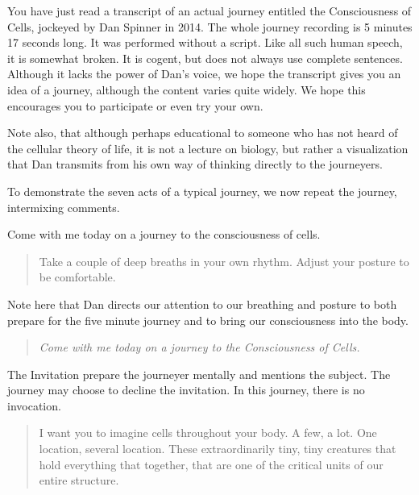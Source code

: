 \documentclass[12pt]{book}
\begin{document}
\hrulefill

You have just read a transcript of an actual journey entitled the Consciousness of Cells, jockeyed by Dan Spinner in 2014. The whole journey recording is 5 minutes 17 seconds long. It was performed without a script. Like all such human speech, it is somewhat broken. It is cogent, but does not always use complete sentences. Although it lacks the power of Dan’s voice, we hope the transcript gives you an idea of a journey, although the content varies quite widely. We hope this encourages you to participate or even  try your own.
					
Note also, that although perhaps educational to someone who has not heard of the cellular theory of life, it is not a lecture on biology, but rather a visualization that Dan transmits from his own way of thinking directly to the journeyers.
					
To demonstrate the seven acts of a typical journey, we now repeat the journey, intermixing comments.

\hrulefill
					
					
					
Come with me today on a journey to the consciousness of cells.




\hrulefill

\begin{quote}{\em

    Take a couple of deep breaths in your own rhythm.
    Adjust your posture to be comfortable.
}
\end{quote}

Note here that Dan directs our attention to our breathing and posture to both prepare for the five minute journey and to bring our consciousness into the body.

\begin{quote}{\em
    Come with me today on a journey to the Consciousness of Cells.
}\end{quote}

The Invitation prepare the journeyer mentally and mentions
the subject. The journey may choose to decline the invitation.
In this journey, there is no invocation.

\begin{quote}{\em

I want you to imagine cells throughout your body. A few, a lot. One location, several location. These extraordinarily tiny, tiny creatures that hold everything that together, that are one of the critical units of our entire structure.

}\end{quote}
\end{document}
